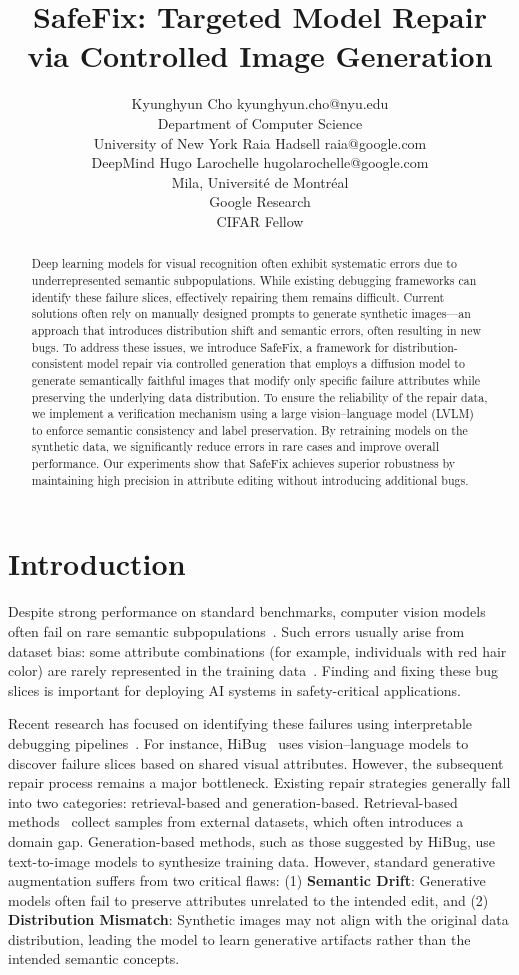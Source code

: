 \documentclass[10pt]{article} %
\title{SafeFix: Targeted Model Repair via Controlled Image Generation}
\author{\name Kyunghyun Cho \email kyunghyun.cho@nyu.edu \\
      \addr Department of Computer Science\\
      University of New York
      \AND
      \name Raia Hadsell \email raia@google.com \\
      \addr DeepMind
      \AND
      \name Hugo Larochelle \email hugolarochelle@google.com\\
      \addr Mila, Universit\'e de Montr\'eal \\
      Google Research\\
      CIFAR Fellow}
\newcommand{\model}{SafeFix\xspace}
\newcommand{\hibug}{HiBug\xspace}
\begin{document}
\maketitle

\begin{abstract}
Deep learning models for visual recognition often exhibit systematic errors due to underrepresented semantic subpopulations. While existing debugging frameworks can identify these failure slices, effectively repairing them remains difficult. Current solutions often rely on manually designed prompts to generate synthetic images—an approach that introduces distribution shift and semantic errors, often resulting in new bugs. To address these issues, we introduce \model, a framework for distribution-consistent model repair via controlled generation that employs a diffusion model to generate semantically faithful images that modify only specific failure attributes while preserving the underlying data distribution. To ensure the reliability of the repair data, we implement a  verification mechanism using a large vision--language model (LVLM) to enforce semantic consistency and label preservation. By retraining models on the synthetic data, we significantly reduce errors in rare cases and improve overall performance. Our experiments show that \model achieves superior robustness by maintaining high precision in attribute editing without introducing additional bugs.
\end{abstract}

\section{Introduction}
Despite strong performance on standard benchmarks, computer vision models often fail on rare semantic subpopulations~\citep{barbu2019objectnet,gao2023adaptive,leclerc20223db}. Such errors usually arise from dataset bias: some attribute combinations (for example, individuals with red hair color) are rarely represented in the training data~\citep{buolamwini2018gender}. Finding and fixing these bug slices is important for deploying AI systems in safety-critical applications.

Recent research has focused on identifying these failures using interpretable debugging pipelines~\citep{gao2023adaptive,chen2023hibug,singla2024data}. For instance, \hibug~\citep{chen2023hibug} uses vision--language models to discover failure slices based on shared visual attributes. However, the subsequent repair process remains a major bottleneck. Existing repair strategies generally fall into two categories: retrieval-based and generation-based. Retrieval-based methods~\citep{gao2023adaptive,singla2024data} collect samples from external datasets, which often introduces a domain gap. Generation-based methods, such as those suggested by \hibug, use text-to-image models to synthesize training data. However, standard generative augmentation suffers from two critical flaws: (1) \textbf{Semantic Drift}: Generative models often fail to preserve attributes unrelated to the intended edit, and (2) \textbf{Distribution Mismatch}: Synthetic images may not align with the original data distribution, leading the model to learn generative artifacts rather than the intended semantic concepts.
\end{document}
